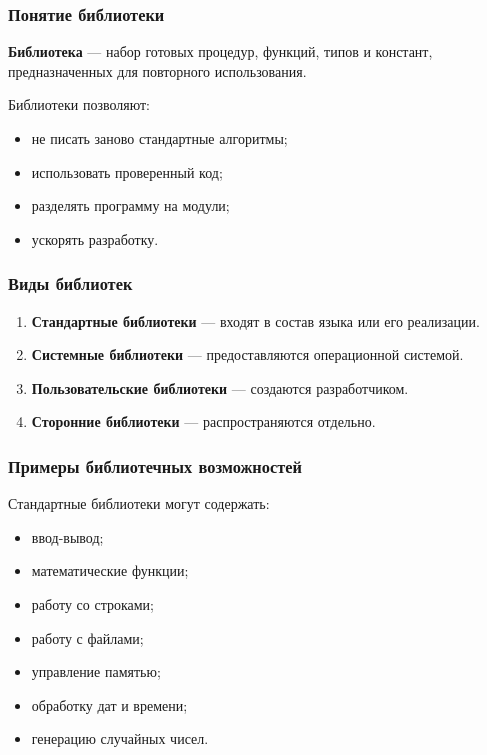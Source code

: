 \documentclass[12pt,a4paper]{article}
\begin{document}
\subsubsection{Понятие библиотеки}

\textbf{Библиотека} --- набор готовых процедур, функций, типов и констант, предназначенных для повторного использования.

Библиотеки позволяют:
\begin{itemize}
    \item не писать заново стандартные алгоритмы;
    \item использовать проверенный код;
    \item разделять программу на модули;
    \item ускорять разработку.
\end{itemize}

\subsubsection{Виды библиотек}

\begin{enumerate}
    \item \textbf{Стандартные библиотеки} --- входят в состав языка или его реализации.
    \item \textbf{Системные библиотеки} --- предоставляются операционной системой.
    \item \textbf{Пользовательские библиотеки} --- создаются разработчиком.
    \item \textbf{Сторонние библиотеки} --- распространяются отдельно.
\end{enumerate}

\subsubsection{Примеры библиотечных возможностей}

Стандартные библиотеки могут содержать:
\begin{itemize}
    \item ввод-вывод;
    \item математические функции;
    \item работу со строками;
    \item работу с файлами;
    \item управление памятью;
    \item обработку дат и времени;
    \item генерацию случайных чисел.
\end{itemize}
\end{document}
